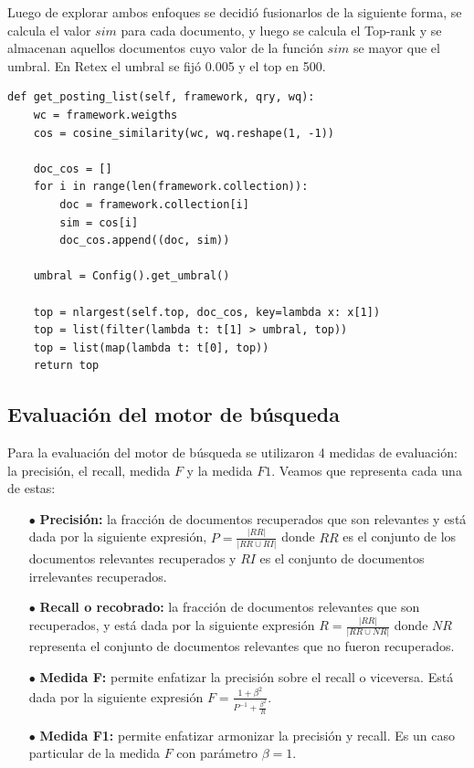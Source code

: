 Luego de explorar ambos enfoques se decidió fusionarlos de la siguiente forma, se calcula el valor $sim$ para cada documento, y luego se calcula el Top-rank y se almacenan aquellos documentos cuyo valor de la función $sim$ se mayor que el umbral. En Retex el umbral se fijó 0.005 y el top en 500. 

\begin{verbatim}
def get_posting_list(self, framework, qry, wq):
    wc = framework.weigths
    cos = cosine_similarity(wc, wq.reshape(1, -1))

    doc_cos = []
    for i in range(len(framework.collection)):
        doc = framework.collection[i]
        sim = cos[i]
        doc_cos.append((doc, sim))

    umbral = Config().get_umbral()

    top = nlargest(self.top, doc_cos, key=lambda x: x[1])
    top = list(filter(lambda t: t[1] > umbral, top))
    top = list(map(lambda t: t[0], top))
    return top
\end{verbatim}

\subsection{Evaluación del motor de búsqueda}

Para la evaluación del motor de búsqueda se utilizaron 4 medidas de evaluación: la precisión, el recall, medida $F$ y la medida $F1$. Veamos que representa cada una de estas:

\begin{enumerate}
    \item[$\bullet$] \textbf{Precisión:} la fracción de documentos recuperados que son relevantes y está dada por la siguiente expresión, $P = \frac{|RR|}{|RR \cup RI|}$ donde $RR$ es el conjunto de los documentos relevantes recuperados y $RI$ es el conjunto de documentos irrelevantes recuperados.
    \item[$\bullet$] \textbf{Recall o recobrado:} la fracción de documentos relevantes que son recuperados, y está dada por la siguiente expresión $R = \frac{|RR|}{|RR \cup NR|}$ donde $NR$ representa el conjunto de documentos relevantes que no fueron recuperados.
    \item[$\bullet$] \textbf{Medida F:} permite enfatizar la precisión sobre el recall o viceversa. Está dada por la siguiente expresión $F = \frac{1 + \beta^2}{P^{-1} + \frac{\beta^2}{R}}$.
    \item[$\bullet$] \textbf{Medida F1:} permite enfatizar armonizar la precisión y recall. Es un caso particular de la medida $F$ con parámetro $\beta = 1$. 
\end{enumerate}

